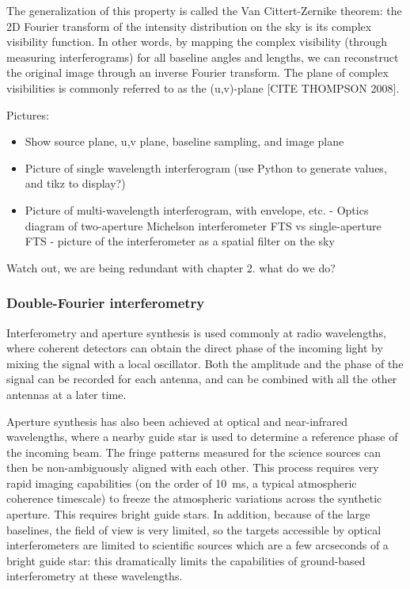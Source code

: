The generalization of this property is called the Van Cittert-Zernike theorem: the 2D Fourier transform of the intensity distribution on the sky is its complex visibility function. In other words, by mapping the complex visibility (through measuring interferograms) for all baseline angles and lengths, we can reconstruct the original image through an inverse Fourier transform. The plane of complex visibilities is commonly referred to as the (u,v)-plane [CITE THOMPSON 2008].





Pictures:
\begin{itemize}
\item Show source plane, u,v plane, baseline sampling, and image plane
\item Picture of single wavelength interferogram (use Python to generate values, and tikz to display?)
\item Picture of multi-wavelength interferogram, with envelope, etc.
- Optics diagram of two-aperture Michelson interferometer FTS vs single-aperture FTS
- picture of the interferometer as a spatial filter on the sky
\end{itemize}

Watch out, we are being redundant with chapter 2. what do we do?

\subsubsection{Double-Fourier interferometry}

Interferometry and aperture synthesis is used commonly at radio wavelengths, where coherent detectors can obtain the direct phase of the incoming light by mixing the signal with a local oscillator. Both the amplitude and the phase of the signal can be recorded for each antenna, and can be combined with all the other antennas at a later time.

Aperture synthesis has also been achieved at optical and near-infrared wavelengths, where a nearby guide star is used to determine a reference phase of the incoming beam. The fringe patterns measured for the science sources can then be non-ambiguously aligned with each other. This process requires very rapid imaging capabilities (on the order of \SI{10}{\milli\second}, a typical atmospheric coherence timescale) to freeze the atmospheric variations across the synthetic aperture. This requires bright guide stars. In addition, because of the large baselines, the field of view is very limited, so the targets accessible by optical interferometers are limited to scientific sources which are a few arcseconds of a bright guide star: this dramatically limits the capabilities of ground-based interferometry at these wavelengths.

